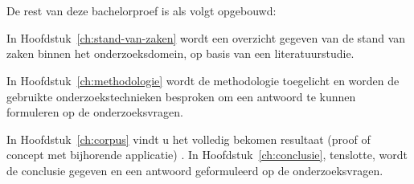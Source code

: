 \section{}
\label{sec:opzet-bachelorproef}


De rest van deze bachelorproef is als volgt opgebouwd:

In Hoofdstuk~\ref{ch:stand-van-zaken} wordt een overzicht gegeven van de stand van zaken binnen het onderzoeksdomein, op basis van een literatuurstudie.

In Hoofdstuk~\ref{ch:methodologie} wordt de methodologie toegelicht en worden de gebruikte onderzoekstechnieken besproken om een antwoord te kunnen formuleren op de onderzoeksvragen.


In Hoofdstuk~\ref{ch:corpus} vindt u het volledig bekomen resultaat (proof of concept met bijhorende applicatie)
.
In Hoofdstuk~\ref{ch:conclusie}, tenslotte, wordt de conclusie gegeven en een antwoord geformuleerd op de onderzoeksvragen.